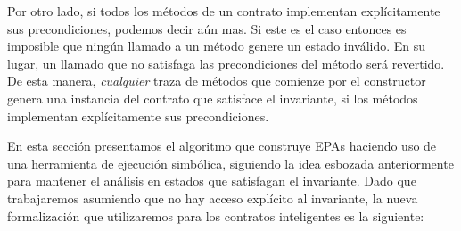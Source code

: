 Por otro lado, si todos los métodos de un contrato implementan explícitamente sus precondiciones, podemos decir aún mas.
Si este es el caso entonces es imposible que ningún llamado a un método genere un estado inválido.
En su lugar, un llamado que no satisfaga las precondiciones del método será revertido.
De esta manera, \textit{cualquier} traza de métodos que comienze por el constructor genera una instancia del contrato que satisface el invariante, si los métodos implementan explícitamente sus precondiciones.

En esta sección presentamos el algoritmo que construye EPAs haciendo uso de una herramienta de ejecución simbólica, siguiendo la idea esbozada anteriormente para mantener el análisis en estados que satisfagan el invariante.
Dado que trabajaremos asumiendo que no hay acceso explícito al invariante, la nueva formalización que utilizaremos para los contratos inteligentes es la siguiente:

